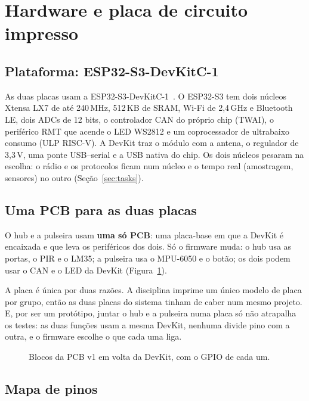 \section{Hardware e placa de circuito impresso}\label{sec:pcb}
\subsection{Plataforma: ESP32-S3-DevKitC-1}

As duas placas usam a ESP32-S3-DevKitC-1~\cite{esp32s3}. O ESP32-S3 tem dois núcleos
Xtensa LX7 de até 240\,MHz, 512\,KB de SRAM, Wi-Fi de 2,4\,GHz e Bluetooth LE, dois ADCs de
12 bits, o controlador CAN do próprio chip (TWAI), o periférico RMT que acende o LED
WS2812 e um coprocessador de ultrabaixo consumo (ULP RISC-V). A DevKit traz o módulo com a
antena, o regulador de 3,3\,V, uma ponte USB--serial e a USB nativa do chip. Os dois núcleos
pesaram na escolha: o rádio e os protocolos ficam num núcleo e o tempo real (amostragem,
sensores) no outro (Seção~\ref{sec:tasks}).

\subsection{Uma PCB para as duas placas}

O hub e a pulseira usam \textbf{uma só PCB}: uma placa-base em que a DevKit é encaixada e
que leva os periféricos dos dois. Só o firmware muda: o hub usa as portas, o PIR e o LM35; a
pulseira usa o MPU-6050 e o botão; os dois podem usar o CAN e o LED da DevKit
(Figura~\ref{fig:pcb_blocos}).

A placa é única por duas razões. A disciplina imprime um único modelo de placa por grupo, então
as duas placas do sistema tinham de caber num mesmo projeto. E, por ser um protótipo, juntar o
hub e a pulseira numa placa só não atrapalha os testes: as duas funções usam a mesma DevKit,
nenhuma divide pino com a outra, e o firmware escolhe o que cada uma liga.

\begin{figure}[H]
\centering
\resizebox{\linewidth}{!}{}
\caption{Blocos da PCB v1 em volta da DevKit, com o GPIO de cada um.}
\label{fig:pcb_blocos}
\end{figure}

\subsection{Mapa de pinos}\label{sec:pinos}

